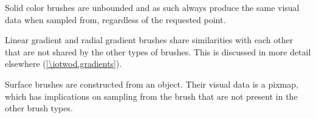 %
%
%
%
%
%
\pnum
Solid color brushes are unbounded and as such always produce the same visual data when sampled from, regardless of the requested point.

\pnum
Linear gradient and radial gradient brushes share similarities with each other that are not shared by the other types of brushes. This is discussed in more detail elsewhere (\ref{\iotwod.gradients}).

\pnum
Surface brushes are constructed from an  object. Their visual data is a pixmap, which has implications on sampling from the brush that are not present in the other brush types.

\addtocounter{SectionDepthBase}{1}






%
%
%
%
\addtocounter{SectionDepthBase}{-1}
